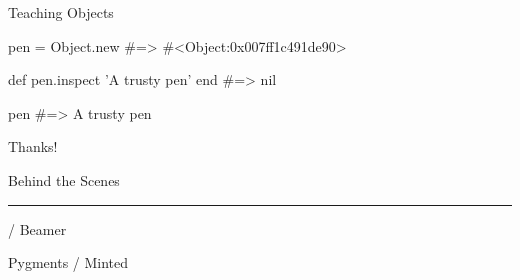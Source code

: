 \documentclass[20pt]{beamer}
\begin{document}
\begin{frame}
	\par{ Teaching Objects}
	\par\vspace{3cm}
\end{frame}

\begin{frame}[fragile]
	\begin{rubycode}
pen = Object.new
#=> #<Object:0x007ff1c491de90>

def pen.inspect
'A trusty pen'
end
#=> nil

pen
#=> A trusty pen
	\end{rubycode}
\end{frame}

\begin{frame}
\end{frame}


\begin{frame}
	\begin{center}
		\vspace{2.5cm}
		{Thanks!}
		\vspace{1.5cm}

		Behind the Scenes
		\par\rule[3mm]{3cm}{0.1mm}

		\XeLaTeX / Beamer

		Pygments / Minted
	\end{center}
\end{frame}
\end{document}
